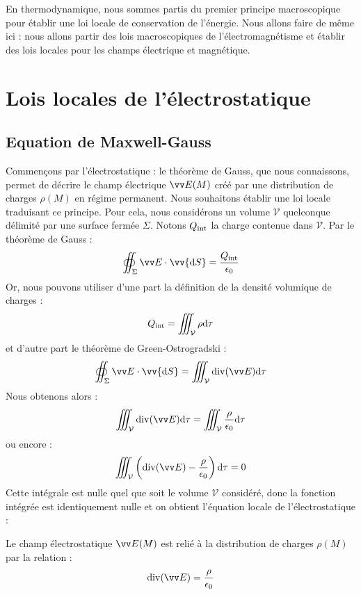 \documentclass[11pt,fleqn]{book} %
\newcommand{\dd}{\mathrm{d}}
\renewcommand{\div}{\mathrm{div}}
\begin{document}
En thermodynamique, nous sommes partis du premier principe macroscopique pour établir une loi locale de conservation de l'énergie. Nous allons faire de même ici : nous allons partir des lois macroscopiques de l'électromagnétisme et établir des lois locales pour les champs électrique et magnétique.

\section{Lois locales de l'électrostatique}

\subsection{Equation de Maxwell-Gauss}

Commençons par l'électrostatique : le théorème de Gauss, que nous connaissons, permet de décrire le champ électrique $\vv E(M)$ créé par une distribution de charges $\rho(M)$ en régime permanent. Nous souhaitons établir une loi locale traduisant ce principe. Pour cela, nous considérons un volume $\mathcal{V}$ quelconque délimité par une surface fermée $\Sigma$. Notons $Q_{\rm int}$ la charge contenue dans $\mathcal{V}$. Par le théorème de Gauss :
\begin{equation}
	\oiint_{\Sigma} \vv E \cdot \vv{\dd S} = \frac{Q_{\rm int}}{\epsilon_0}
\end{equation}
Or, nous pouvons utiliser d'une part la définition de la densité volumique de charges :
\begin{equation}
	Q_{\rm int} = \iiint_{\mathcal{V}} \rho \dd \tau
\end{equation}
et d'autre part le théorème de Green-Ostrogradski :
\begin{equation}
	\oiint_{\Sigma} \vv E \cdot \vv{\dd S} = \iiint_\mathcal{V} \div(\vv E) \dd \tau
\end{equation}
Nous obtenons alors :
\begin{equation}
	\iiint_\mathcal{V} \div(\vv E) \dd \tau = \iiint_{\mathcal{V}} \frac{\rho}{\epsilon_0} \dd \tau 
\end{equation}
ou encore :
\begin{equation}
	\iiint_\mathcal{V} \left( \div (\vv E) - \frac{\rho}{\epsilon_0} \right) \dd \tau = 0
\end{equation}
Cette intégrale est nulle quel que soit le volume $\mathcal{V}$ considéré, donc la fonction intégrée est identiquement nulle et on obtient l'équation locale de l'électrostatique :
\begin{proposition}
	Le champ électrostatique $\vv E(M)$ est relié à la distribution de charges $\rho(M)$ par la relation :
	\begin{equation}
		\div ( \vv E) = \frac{\rho}{\epsilon_0}
	\end{equation}
\end{proposition}
\end{document}
